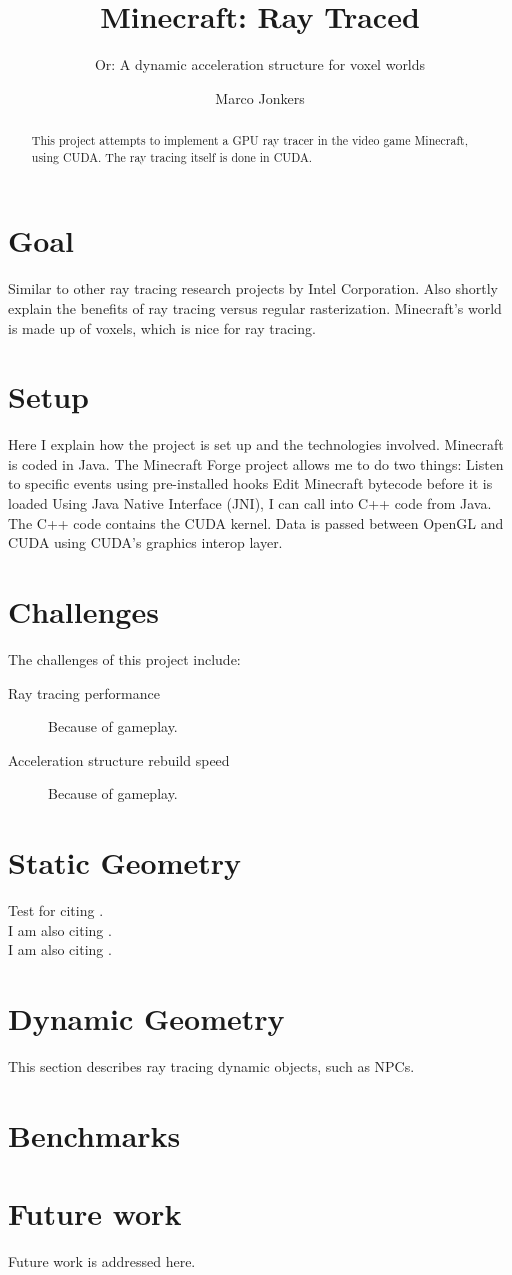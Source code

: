 \documentclass[]{scrartcl}
\title{Minecraft: Ray Traced}
\subtitle{Or: A dynamic acceleration structure for voxel worlds}
\author{Marco Jonkers}
\begin{document}
\maketitle

\begin{abstract}
This project attempts to implement a GPU ray tracer in the video game Minecraft, using CUDA.
The ray tracing itself is done in CUDA.
\end{abstract}

\section{Goal}
Similar to other ray tracing research projects by Intel Corporation.
Also shortly explain the benefits of ray tracing versus regular rasterization.
Minecraft's world is made up of voxels, which is nice for ray tracing.

\section{Setup}
Here I explain how the project is set up and the technologies involved.
Minecraft is coded in Java.
The Minecraft Forge project allows me to do two things:
    Listen to specific events using pre-installed hooks
    Edit Minecraft bytecode before it is loaded
Using Java Native Interface (JNI), I can call into C++ code from Java.
The C++ code contains the CUDA kernel.
Data is passed between OpenGL and CUDA using CUDA's graphics interop layer.

\section{Challenges}
The challenges of this project include:
\begin{description}
    \item [Ray tracing performance] Because of gameplay.
    \item [Acceleration structure rebuild speed] Because of gameplay.
\end{description}

\section{Static Geometry}
Test for citing \cite{amanatides1987fast}.
\\
I am also citing \cite{ivson2009gpu}.
\\
I am also citing \cite{reinhard2000dynamic}.

\section{Dynamic Geometry}
This section describes ray tracing dynamic objects, such as NPCs.

\section{Benchmarks}


\section{Future work}
Future work is addressed here.

{}

\end{document}
